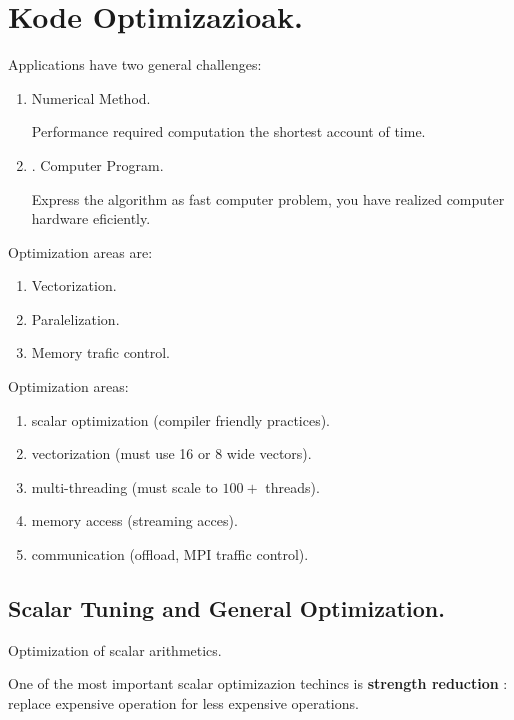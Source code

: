 \section{Kode Optimizazioak.}

Applications have two general challenges:
\begin{enumerate}
\item Numerical Method.

Performance required computation the shortest account of time.

\item. Computer Program.

Express the algorithm as fast computer problem, you have realized computer hardware eficiently.

\end{enumerate}

Optimization areas are:
\begin{enumerate}
\item Vectorization.
\item Paralelization.
\item Memory trafic control.
\end{enumerate}

Optimization areas:
\begin{enumerate}
\item scalar optimization (compiler friendly practices).

\item vectorization (must use 16 or 8 wide vectors).

\item multi-threading (must  scale to $100+$ threads).

\item memory access (streaming acces).

\item communication (offload, MPI traffic control).

\end{enumerate}


\subsection*{Scalar Tuning and General Optimization.}

Optimization of scalar arithmetics.

One of the most important scalar optimizazion techincs is  \textbf{strength reduction} : replace expensive operation for less expensive operations.

